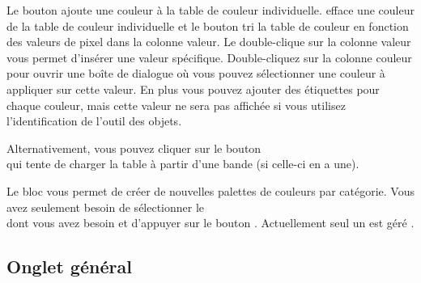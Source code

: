 Le bouton  ajoute une couleur à la table de couleur individuelle.
 efface une couleur de la table de couleur individuelle et le bouton  tri la table de couleur en fonction des valeurs de pixel dans la colonne valeur.
Le double-clique sur la colonne valeur vous permet d'insérer une valeur spécifique. Double-cliquez sur la colonne couleur pour ouvrir une boîte de dialogue  où vous pouvez sélectionner une couleur à appliquer sur cette valeur. En plus vous pouvez ajouter des étiquettes
pour chaque couleur, mais cette valeur ne sera pas affichée si vous utilisez l'identification de l'outil des objets.

Alternativement, vous pouvez cliquer sur le bouton\\
 qui tente de charger la table à partir d'une bande (si celle-ci en a une).

Le bloc  vous permet de créer de nouvelles palettes de couleurs par catégorie. Vous avez seulement besoin de sélectionner le\\  dont vous avez besoin et d'appuyer sur le bouton . Actuellement seul un  est géré .

\subsection{Onglet général}\label{label_generaltab}

